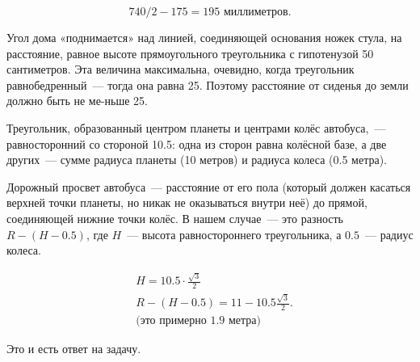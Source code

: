\begin{itemize}

\itA $$740/2-175 = 195\text{\ миллиметров.}$$

\itB Угол дома «поднимается» над линией, соединяющей основания ножек стула, на расстояние, равное высоте прямоугольного треугольника с гипотенузой 50 сантиметров. Эта величина максимальна, очевидно, когда треугольник равнобедренный~— тогда она равна \SI{25}{}. Поэтому расстояние от сиденья до земли должно быть не ме-\linebreak ньше \SI{25}{}.

\begin{center}  \end{center}

\itC Треугольник, образованный центром планеты и центрами колёс автобуса,~— равносторонний со стороной \SI{10.5}{}: одна из сторон равна колёсной базе, а две других~— сумме радиуса планеты (10 метров) и радиуса колеса (0.5 метра).

\begin{center}
\end{center}

Дорожный просвет автобуса~— расстояние от его пола (который должен касаться верхней точки планеты, но никак не оказываться внутри неё) до прямой, соединяющей нижние точки колёс. В нашем случае~— это разность $R-(H-0.5)$, где $H$~— высота равностороннего треугольника, а $0.5$~— радиус колеса.

\begin{align*}
	& H = 10.5 \cdot \frac{\sqrt{3}}{2} \\
	& R-(H-0.5) = 11 - 10.5\frac{\sqrt{3}}{2}. \\
	& \text{(это примерно 1.9 метра)}
\end{align*}

Это и есть ответ на задачу.
\end{itemize}